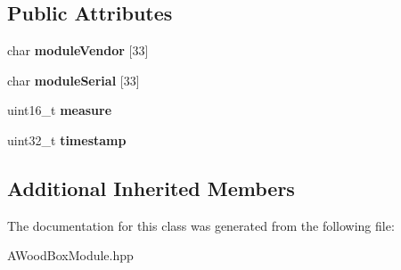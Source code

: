 \subsection*{Public Attributes}
\begin{DoxyCompactItemize}
\item 
\mbox{\label{classwood_box_1_1module_1_1_a_wood_box_module_af606a06208d58a95c65643d29e7d46e8}} 
char {\bfseries module\+Vendor} \mbox{[}33\mbox{]}
\item 
\mbox{\label{classwood_box_1_1module_1_1_a_wood_box_module_a9786d6aaec0d2d1ce2f27b9f73f30c20}} 
char {\bfseries module\+Serial} \mbox{[}33\mbox{]}
\item 
\mbox{\label{classwood_box_1_1module_1_1_a_wood_box_module_a6af0bda7216b8d2c5e0bf77c29c44613}} 
uint16\+\_\+t {\bfseries measure}
\item 
\mbox{\label{classwood_box_1_1module_1_1_a_wood_box_module_a84edcbe776911c90e8dacc02d475c0d0}} 
uint32\+\_\+t {\bfseries timestamp}
\end{DoxyCompactItemize}
\subsection*{Additional Inherited Members}


The documentation for this class was generated from the following file\+:\begin{DoxyCompactItemize}
\item 
A\+Wood\+Box\+Module.\+hpp\end{DoxyCompactItemize}
